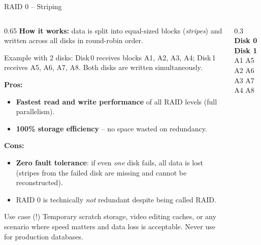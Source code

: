 \begin{frame}{RAID 0 -- Striping}
  \begin{columns}
    \begin{column}{0.65\textwidth}
      \textbf{How it works:} data is split into equal-sized blocks (\emph{stripes}) and written
      across all disks in round-robin order.

      \medskip
      Example with 2 disks: Disk\,0 receives blocks A1, A2, A3, A4; Disk\,1 receives A5, A6, A7,
      A8. Both disks are written simultaneously.

      \medskip
      \textbf{Pros:}
      \begin{itemize}
        \item \textbf{Fastest read and write performance} of all RAID levels (full parallelism).
        \item \textbf{100\% storage efficiency} -- no space wasted on redundancy.
      \end{itemize}

      \textbf{Cons:}
      \begin{itemize}
        \item \textbf{Zero fault tolerance}: if even \emph{one} disk fails, all data is lost
              (stripes from the failed disk are missing and cannot be reconstructed).
        \item RAID 0 is technically \emph{not} redundant despite being called RAID.
      \end{itemize}

      \begin{alertblock}{Use case (!)}
        Temporary scratch storage, video editing caches, or any scenario where speed matters and
        data loss is acceptable. Never use for production databases.
      \end{alertblock}
    \end{column}
    \begin{column}{0.3\textwidth}
      \centering
      \textbf{Disk 0} \quad \textbf{Disk 1}\\[4pt]
      A1 \quad A5\\
      A2 \quad A6\\
      A3 \quad A7\\
      A4 \quad A8\\
    \end{column}
  \end{columns}
\end{frame}

